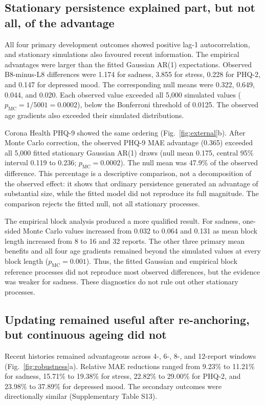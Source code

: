 \documentclass[pdflatex,sn-vancouver-num]{sn-jnl}
\begin{document}
\subsection{Stationary persistence explained part, but not all, of the advantage}

All four primary development outcomes showed positive lag-1 autocorrelation, and stationary simulations also favoured recent information. The empirical advantages were larger than the fitted Gaussian AR(1) expectations. Observed B8-minus-L8 differences were 1.174 for sadness, 3.855 for stress, 0.228 for PHQ-2, and 0.147 for depressed mood. The corresponding null means were 0.322, 0.649, 0.044, and 0.020. Each observed value exceeded all 5,000 simulated values ($p_{\mathrm{MC}}=1/5001=0.0002$), below the Bonferroni threshold of 0.0125. The observed age gradients also exceeded their simulated distributions.

Corona Health PHQ-9 showed the same ordering (Fig.~\ref{fig:external}b). After Monte Carlo correction, the observed PHQ-9 MAE advantage (0.365) exceeded all 5,000 fitted stationary Gaussian AR(1) draws (null mean 0.175, central 95\% interval 0.119 to 0.236; $p_{\mathrm{MC}}=0.0002$). The null mean was 47.9\% of the observed difference. This percentage is a descriptive comparison, not a decomposition of the observed effect: it shows that ordinary persistence generated an advantage of substantial size, while the fitted model did not reproduce its full magnitude. The comparison rejects the fitted null, not all stationary processes.

The empirical block analysis produced a more qualified result. For sadness, one-sided Monte Carlo values increased from 0.032 to 0.064 and 0.131 as mean block length increased from 8 to 16 and 32 reports. The other three primary mean benefits and all four age gradients remained beyond the simulated values at every block length ($p_{\mathrm{MC}}=0.001$). Thus, the fitted Gaussian and empirical block reference processes did not reproduce most observed differences, but the evidence was weaker for sadness. These diagnostics do not rule out other stationary processes.

\subsection{Updating remained useful after re-anchoring, but continuous ageing did not}

Recent histories remained advantageous across 4-, 6-, 8-, and 12-report windows (Fig.~\ref{fig:robustness}a). Relative MAE reductions ranged from 9.23\% to 11.21\% for sadness, 15.71\% to 19.38\% for stress, 22.82\% to 29.00\% for PHQ-2, and 23.98\% to 37.89\% for depressed mood. The secondary outcomes were directionally similar (Supplementary Table S13).
\end{document}
